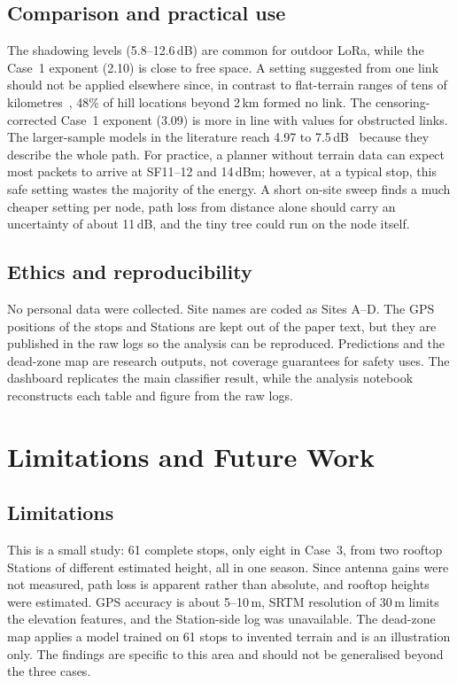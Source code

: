\documentclass[conference]{IEEEtran}
\newcommand{\dBm}{\,dBm\xspace}
\newcommand{\dB}{\,dB\xspace}
\begin{document}
\subsection{Comparison and practical use}
The shadowing levels (5.8--12.6\dB) are common for outdoor LoRa, while the Case~1 exponent (2.10) is close to free space. A setting suggested from one link~\cite{pokharel2024} should not be applied elsewhere since, in contrast to flat-terrain ranges of tens of kilometres~\cite{petajajarvi2015}, 48\% of hill locations beyond 2\,km formed no link. The censoring-corrected Case~1 exponent (3.09) is more in line with values for obstructed links. The larger-sample models in the literature reach 4.97 to 7.5\dB~\cite{ojo2024,ethier2024} because they describe the whole path. For practice, a planner without terrain data can expect most packets to arrive at SF11--12 and 14\dBm; however, at a typical stop, this safe setting wastes the majority of the energy. A short on-site sweep finds a much cheaper setting per node, path loss from distance alone should carry an uncertainty of about 11\dB, and the tiny tree could run on the node itself.

\subsection{Ethics and reproducibility}
No personal data were collected. Site names are coded as Sites A--D. The GPS positions of the stops and Stations are kept out of the paper text, but they are published in the raw logs so the analysis can be reproduced. Predictions and the dead-zone map are research outputs, not coverage guarantees for safety uses. The dashboard replicates the main classifier result, while the analysis notebook reconstructs each table and figure from the raw logs.

\section{Limitations and Future Work}\label{sec:limits}
\subsection{Limitations}
This is a small study: 61 complete stops, only eight in Case~3, from two rooftop Stations of different estimated height, all in one season. Since antenna gains were not measured, path loss is apparent rather than absolute, and rooftop heights were estimated. GPS accuracy is about 5--10\,m, SRTM resolution of 30\,m limits the elevation features, and the Station-side log was unavailable. The dead-zone map applies a model trained on 61 stops to invented terrain and is an illustration only. The findings are specific to this area and should not be generalised beyond the three cases.
\end{document}
